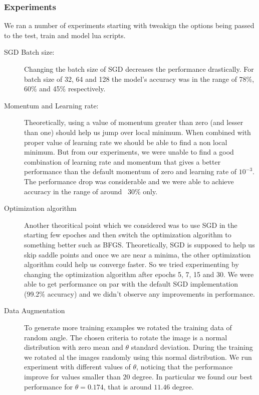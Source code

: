 \documentclass{article}
\begin{document}
\subsubsection{Experiments}
  We ran a number of experiments starting with tweakign the options being passed to the test, train and model lua scripts.
\begin{description}

  \item[SGD Batch size:] Changing the batch size of SGD decreases the performance drastically.  For batch size of 32, 64 and 128 the model's accuracy was in the range of 78\%, 60\% and  45\% respectively.

  \item[Momentum and Learning rate:] Theoretically, using a value of momentum greater than zero (and lesser than one) should help us jump over local minimum.  When combined with proper value of learning rate we should be able to find a non local minimum.  But from our experiments, we were unable to find a good combination of learning rate and momentum that gives a better performance than the default momentum of zero and learning rate of $10^{-3} $.  The performance drop was considerable and we were able to achieve accuracy in the range of around ~30\% only.

  \item[Optimization algorithm] Another theoritical point which we considered was to use SGD in the starting few epoches and then switch the optimization algorithm to something better such as BFGS.  Theoretically, SGD is supposed to help us skip saddle points and once we are near a minima, the other optimization algorithm could help us converge faster.  So we tried experimenting by changing the optimization algorithm after epochs 5, 7, 15 and 30.  We were able to get performance on par with the default SGD implementation (99.2\% accuracy) and we didn't observe any improvements in performance.
  
\item[Data Augmentation]  To generate more training examples we rotated the training data of random angle. The chosen criteria to rotate the image is a normal distribution with zero mean and $\theta$ standard deviation. During the training we rotated al the images randomly using this normal distribution. We run experiment with different values of $\theta$, noticing that the performance improve for values smaller than  $20$ degree. In particular we found our best performance for $\theta=0.174$, that is around $11.46$ degree.


\end{description}
\end{document}

